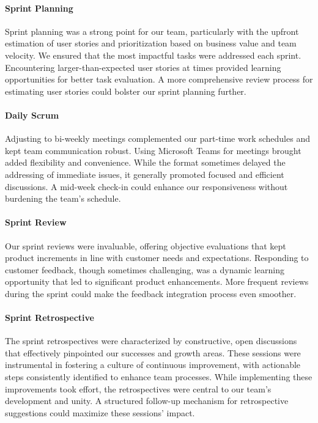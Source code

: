 \paragraph{Sprint Planning}
Sprint planning was a strong point for our team, particularly with the upfront estimation of user stories and prioritization based on business value and team velocity.
We ensured that the most impactful tasks were addressed each sprint.
Encountering larger-than-expected user stories at times provided learning opportunities for better task evaluation.
A more comprehensive review process for estimating user stories could bolster our sprint planning further.

\paragraph{Daily Scrum}
Adjusting to bi-weekly meetings complemented our part-time work schedules and kept team communication robust.
Using Microsoft Teams for meetings brought added flexibility and convenience.
While the format sometimes delayed the addressing of immediate issues, it generally promoted focused and efficient discussions.
A mid-week check-in could enhance our responsiveness without burdening the team's schedule.

\paragraph{Sprint Review}
Our sprint reviews were invaluable, offering objective evaluations that kept product increments in line with customer needs and expectations.
Responding to customer feedback, though sometimes challenging, was a dynamic learning opportunity that led to significant product enhancements.
More frequent reviews during the sprint could make the feedback integration process even smoother.

\paragraph{Sprint Retrospective}
The sprint retrospectives were characterized by constructive, open discussions that effectively pinpointed our successes and growth areas.
These sessions were instrumental in fostering a culture of continuous improvement, with actionable steps consistently identified to enhance team processes.
While implementing these improvements took effort, the retrospectives were central to our team's development and unity.
A structured follow-up mechanism for retrospective suggestions could maximize these sessions' impact.

